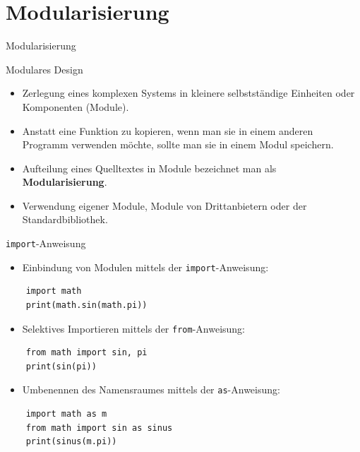 \documentclass[utf8, smaller, c]{beamer}
\renewcommand{\tt}[1]{{\texttt{#1}}}
\begin{document}
\section{Modularisierung}
\begin{frame}{Modularisierung}
	\begin{block}{Modulares Design}
		\begin{itemize}
			\item Zerlegung eines komplexen Systems in kleinere selbstständige Einheiten oder Komponenten (Module).
			\item Anstatt eine Funktion zu kopieren, wenn man sie in einem anderen Programm verwenden möchte, sollte
			man	sie in einem Modul speichern.
			\item Aufteilung eines Quelltextes in Module bezeichnet man als \textbf{Modularisierung}.
			\item Verwendung eigener Module, Module von Drittanbietern oder der Standardbibliothek.
		\end{itemize}
	\end{block}
	
	\pagebreak
	
	\begin{block}{\tt{import}-Anweisung}
		\begin{itemize}
			\item Einbindung von Modulen mittels der \tt{import}-Anweisung:
		\end{itemize}
		\begin{lstlisting}
	import math
	print(math.sin(math.pi))
		\end{lstlisting}
		\begin{itemize}
			\item Selektives Importieren mittels der \tt{from}-Anweisung:
		\end{itemize}
		\begin{lstlisting}
	from math import sin, pi
	print(sin(pi))
		\end{lstlisting}
		\begin{itemize}
			\item Umbenennen des Namensraumes mittels der \tt{as}-Anweisung:
		\end{itemize}
		\begin{lstlisting}
	import math as m
	from math import sin as sinus
	print(sinus(m.pi))
		\end{lstlisting}
	\end{block}
	

\end{frame}
\end{document}
